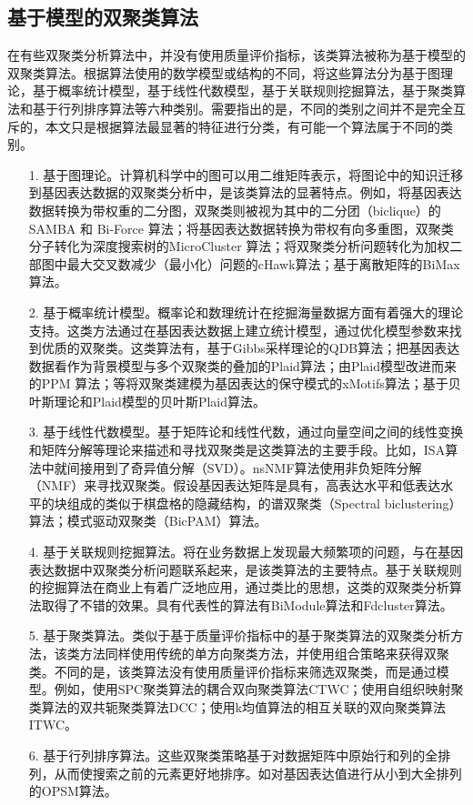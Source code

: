   \subsection{基于模型的双聚类算法}
  在有些双聚类分析算法中，并没有使用质量评价指标，该类算法被称为基于模型的双聚类算法。根据算法使用的数学模型或结构的不同，将这些算法分为基于图理论，基于概率统计模型，基于线性代数模型，基于关联规则挖掘算法，基于聚类算法和基于行列排序算法等六种类别。需要指出的是，不同的类别之间并不是完全互斥的，本文只是根据算法最显著的特征进行分类，有可能一个算法属于不同的类别。

  \begin{enumerate}
    \item[1.]基于图理论。计算机科学中的图可以用二维矩阵表示，将图论中的知识迁移到基因表达数据的双聚类分析中，是该类算法的显著特点。例如，将基因表达数据转换为带权重的二分图，双聚类则被视为其中的二分团（biclique）的SAMBA 和 Bi-Force 算法；将基因表达数据转换为带权有向多重图，双聚类分子转化为深度搜索树的MicroCluster 算法；将双聚类分析问题转化为加权二部图中最大交叉数减少（最小化）问题的cHawk算法；基于离散矩阵的BiMax算法。

    \item[2.]基于概率统计模型。概率论和数理统计在挖掘海量数据方面有着强大的理论支持。这类方法通过在基因表达数据上建立统计模型，通过优化模型参数来找到优质的双聚类。这类算法有，基于Gibbs采样理论的QDB算法；把基因表达数据看作为背景模型与多个双聚类的叠加的Plaid算法；由Plaid模型改进而来的PPM 算法；等将双聚类建模为基因表达的保守模式的xMotifs算法；基于贝叶斯理论和Plaid模型的贝叶斯Plaid算法。
    
    \item[3.]基于线性代数模型。基于矩阵论和线性代数，通过向量空间之间的线性变换和矩阵分解等理论来描述和寻找双聚类是这类算法的主要手段。比如，ISA算法中就间接用到了奇异值分解（SVD）。nsNMF算法使用非负矩阵分解（NMF）来寻找双聚类。假设基因表达矩阵是具有，高表达水平和低表达水平的块组成的类似于棋盘格的隐藏结构，的谱双聚类（Spectral biclustering）算法；模式驱动双聚类（BicPAM）算法。
    
    \item[4.]基于关联规则挖掘算法。将在业务数据上发现最大频繁项的问题，与在基因表达数据中双聚类分析问题联系起来，是该类算法的主要特点。基于关联规则的挖掘算法在商业上有着广泛地应用，通过类比的思想，这类的双聚类分析算法取得了不错的效果。具有代表性的算法有BiModule算法和Fdcluster算法。

    \item[5.]基于聚类算法。类似于基于质量评价指标中的基于聚类算法的双聚类分析方法，该类方法同样使用传统的单方向聚类方法，并使用组合策略来获得双聚类。不同的是，该类算法没有使用质量评价指标来筛选双聚类，而是通过模型。例如，使用SPC聚类算法的耦合双向聚类算法CTWC；使用自组织映射聚类算法的双共轭聚类算法DCC；使用k均值算法的相互关联的双向聚类算法ITWC。
    
    \item[6.]基于行列排序算法。这些双聚类策略基于对数据矩阵中原始行和列的全排列，从而使搜索之前的元素更好地排序。如对基因表达值进行从小到大全排列的OPSM算法。
  \end{enumerate}

